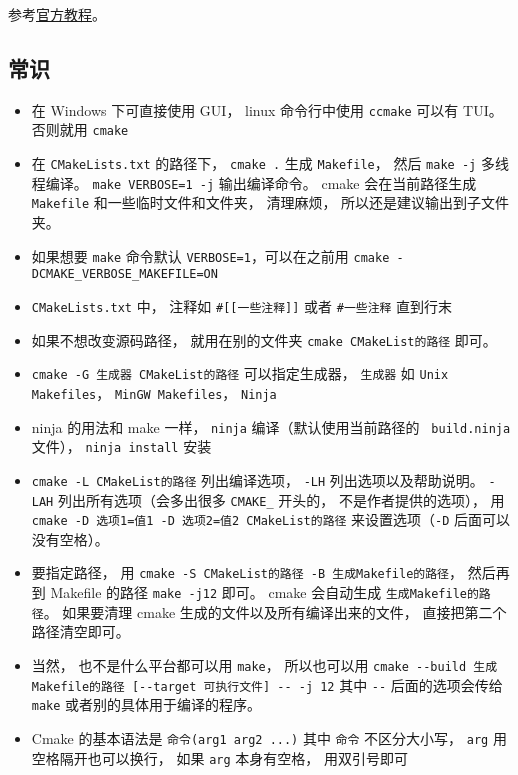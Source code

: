 


参考\href{https://cmake.org/cmake/help/latest/guide/tutorial/index.html}{官方教程}。

\subsection{常识}
\begin{itemize}
\item 在 Windows 下可直接使用 GUI， linux 命令行中使用 \verb`ccmake` 可以有 TUI。 否则就用 \verb`cmake`
\item 在 \verb`CMakeLists.txt` 的路径下， \verb`cmake .` 生成 \verb`Makefile`， 然后 \verb`make -j` 多线程编译。 \verb`make VERBOSE=1 -j` 输出编译命令。 cmake 会在当前路径生成 \verb`Makefile` 和一些临时文件和文件夹， 清理麻烦， 所以还是建议输出到子文件夹。
\item 如果想要 \verb`make` 命令默认 \verb`VERBOSE=1`，可以在之前用 \verb`cmake -DCMAKE_VERBOSE_MAKEFILE=ON`
\item \verb`CMakeLists.txt` 中， 注释如 \verb`#[[一些注释]]` 或者 \verb`#一些注释` 直到行末
\item 如果不想改变源码路径， 就用在别的文件夹 \verb`cmake CMakeList的路径` 即可。
\item \verb`cmake -G 生成器 CMakeList的路径` 可以指定生成器， \verb`生成器` 如 \verb`Unix Makefiles`， \verb`MinGW Makefiles`， \verb`Ninja`
\item ninja 的用法和 make 一样， \verb`ninja` 编译（默认使用当前路径的 \verb` build.ninja` 文件）， \verb`ninja install` 安装
\item \verb`cmake -L CMakeList的路径` 列出编译选项， \verb`-LH` 列出选项以及帮助说明。 \verb`-LAH` 列出所有选项（会多出很多 \verb`CMAKE_` 开头的， 不是作者提供的选项）， 用 \verb`cmake -D 选项1=值1 -D 选项2=值2 CMakeList的路径` 来设置选项（\verb`-D` 后面可以没有空格）。
\item 要指定路径， 用 \verb`cmake -S CMakeList的路径 -B 生成Makefile的路径`， 然后再到 Makefile 的路径 \verb`make -j12` 即可。 cmake 会自动生成 \verb`生成Makefile的路径`。 如果要清理 cmake 生成的文件以及所有编译出来的文件， 直接把第二个路径清空即可。
\item 当然， 也不是什么平台都可以用 \verb`make`， 所以也可以用 \verb`cmake --build 生成Makefile的路径 [--target 可执行文件] -- -j 12` 其中 \verb`--` 后面的选项会传给 \verb`make` 或者别的具体用于编译的程序。
\item Cmake 的基本语法是 \verb`命令(arg1 arg2 ...)` 其中 \verb`命令` 不区分大小写， \verb`arg` 用空格隔开也可以换行， 如果 \verb`arg` 本身有空格， 用双引号即可

\end{itemize}
